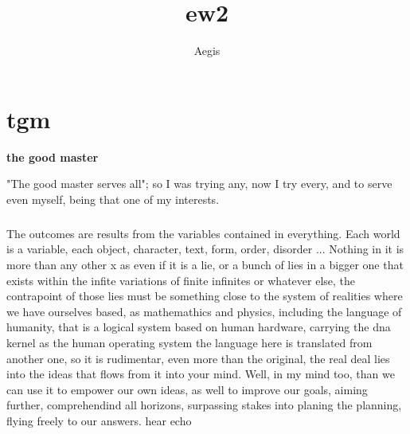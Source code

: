\documentclass[a4paper,11pt]{book}
\title{ew2}
\author{Aegis}
\begin{document}
\maketitle
\tableofcontents

\chapter{tgm}
\begin{center}
  \textbf{the good master}
\end{center}
\begin{center}
"The good master serves all";
\linebreak
so I was trying any,
\linebreak
now I try every, 
\linebreak
and to serve even myself,
\linebreak
being that one of my interests.
\linebreak
\end{center}
  \paragraph{}The outcomes are results from the variables contained in everything.
\linebreak
Each world is a variable, each object, character, text, form, order, disorder
\linebreak
...
\linebreak
Nothing in it is more than any other x
\linebreak
as even if it is a lie, or a bunch of lies in a bigger one that exists
\linebreak
within the infite variations of finite infinites or whatever else,
\linebreak
the contrapoint of those lies must be something close to the system of
\linebreak
realities where we have ourselves based, as mathemathics and physics,
\linebreak
including the language of humanity, that is a logical system based on human
\linebreak
hardware, carrying the dna kernel as the human operating system
\linebreak
the language here is translated from another one,
\linebreak
so it is rudimentar, even more than the original,
\linebreak
the real deal lies into the ideas that flows from it into your mind.
\linebreak
Well, in my mind too, than we can use it to empower our own ideas, as well
\linebreak
to improve our goals, aiming further, comprehendind all horizons, 
\linebreak
surpassing stakes into planing the planning, flying freely to our answers.
\linebreak
\linebreak
hear
\linebreak
\linebreak
echo
\linebreak
\end{document}
